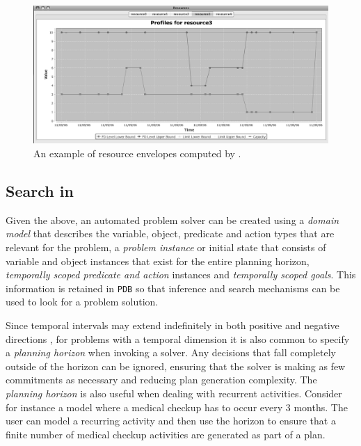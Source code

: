 \begin{figure}
\centering
\includegraphics[scale=0.2]{figs/europa-resource-envelopes.png}
\caption{\small An example of resource envelopes \cite{Muscettola04,Muscettola06} computed by \eu.}
\label{fig:resenvelopes}
\end{figure}


\subsection{Search in \eu}
\label{sec:europa:search}

Given the above, an automated problem solver can be created using a
\emph{domain model} that describes the variable, object, predicate and
action types that are relevant for the problem, a \emph{problem
  instance} or initial state that consists of variable and object
instances that exist for the entire planning horizon, \emph{temporally
  scoped predicate and action} instances and \emph{temporally scoped
  goals}. This information is retained in \eus \texttt{PDB} so that
inference and search mechanisms can be used to look for a problem
solution.

Since temporal intervals may extend indefinitely in both positive and
negative directions \kcomment{(\eg $[-\infty,+\infty]$)}, for problems
with a temporal dimension it is also common to specify a
\emph{planning horizon} when invoking a solver. Any decisions that
fall completely outside of the horizon can be ignored, ensuring that
the solver is making as few commitments as necessary and reducing plan
generation complexity.  The \emph{planning horizon} is also useful
when dealing with recurrent activities. Consider for instance a model
where a medical checkup has to occur every $3$ months. The user can
model a recurring activity and then use the horizon to ensure that a
finite number of medical checkup activities are generated as part of a
plan.

